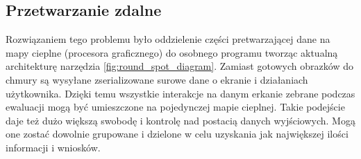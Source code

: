 \subsection{Przetwarzanie zdalne}
Rozwiązaniem tego problemu było oddzielenie części pretwarzającej dane na mapy cieplne (procesora graficznego) do osobnego programu tworząc aktualną architekturę narzędzia \ref{fig:round_spot_diagram}. Zamiast gotowych obrazków do chmury są wysyłane zserializowane surowe dane o ekranie i działaniach użytkownika. Dzięki temu wszystkie interakcje na danym erkanie zebrane podczas ewaluacji mogą być umieszczone na pojedynczej mapie cieplnej. Takie podejście daje też dużo większą swobodę i kontrolę nad postacią danych wyjściowych. Mogą one zostać dowolnie grupowane i dzielone w celu uzyskania jak największej ilości informacji i wniosków.


